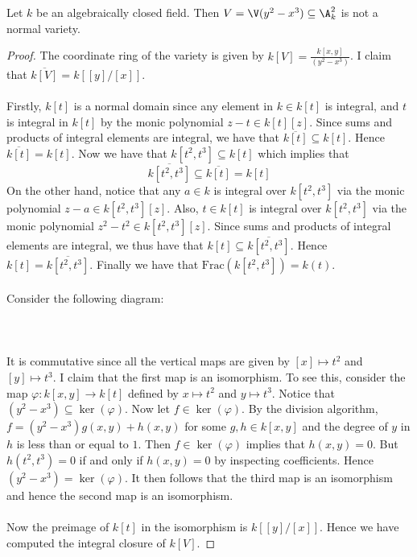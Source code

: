 \documentclass[a4paper]{article}
\begin{document}
\begin{eg}{}{} Let $k$ be an algebraically closed field. Then $V=\V(y^2-x^3)\subseteq\A_k^2$ is not a normal variety. \tcbline
\begin{proof}
The coordinate ring of the variety is given by $k[V]=\frac{k[x,y]}{(y^2-x^3)}$. I claim that $\overline{k[V]}=k[[y]/[x]]$. \\~\\

Firstly, $k[t]$ is a normal domain since any element in $k\in k[t]$ is integral, and $t$ is integral in $k[t]$ by the monic polynomial $z-t\in k[t][z]$. Since sums and products of integral elements are integral, we have that $\overline{k[t]}\subseteq k[t]$. Hence $\overline{k[t]}=k[t]$. Now we have that $k[t^2,t^3]\subseteq k[t]$ which implies that $$\overline{k[t^2,t^3]}\subseteq\overline{k[t]}=k[t]$$ On the other hand, notice that any $a\in k$ is integral over $k[t^2,t^3]$ via the monic polynomial $z-a\in k[t^2,t^3][z]$. Also, $t\in k[t]$ is integral over $k[t^2,t^3]$ via the monic polynomial $z^2-t^2\in k[t^2,t^3][z]$. Since sums and products of integral elements are integral, we thus have that $k[t]\subseteq\overline{k[t^2,t^3]}$. Hence $k[t]=\overline{k[t^2,t^3]}$. Finally we have that $\text{Frac}(k[t^2,t^3])=k(t)$. \\~\\

Consider the following diagram: \\~\\
 \\~\\
It is commutative since all the vertical maps are given by $[x]\mapsto t^2$ and $[y]\mapsto t^3$. I claim that the first map is an isomorphism. To see this, consider the map $\varphi:k[x,y]\to k[t]$ defined by $x\mapsto t^2$ and $y\mapsto t^3$. Notice that $(y^2-x^3)\subseteq\ker(\varphi)$. Now let $f\in\ker(\varphi)$. By the division algorithm, $f=(y^2-x^3)g(x,y)+h(x,y)$ for some $g,h\in k[x,y]$ and the degree of $y$ in $h$ is less than or equal to $1$. Then $f\in\ker(\varphi)$ implies that $h(x,y)=0$. But $h(t^2,t^3)=0$ if and only if $h(x,y)=0$ by inspecting coefficients. Hence $(y^2-x^3)=\ker(\varphi)$. It then follows that the third map is an isomorphism and hence the second map is an isomorphism. \\~\\

Now the preimage of $k[t]$ in the isomorphism is $k[[y]/[x]]$. Hence we have computed the integral closure of $k[V]$. 
\end{proof}
\end{eg}
\end{document}
